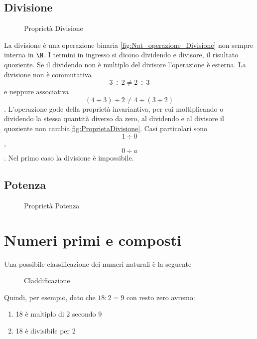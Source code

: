 \subsection{Divisione}
\label{sec:Numerinatdiv}
\begin{figure} %
	\centering

	\caption{Proprietà Divisione}\label{sec:NumerinatDiff}
	\label{fig:ProprietaDivisione}\end{figure}
La divisione è una operazione binaria \nobs\vref{fig:Nat_operazione_Divisione} non sempre interna in $\N$. I termini in ingresso si dicono dividendo e divisore, il risultato quoziente. Se il dividendo non è  multiplo  del divisore l'operazione è esterna. La divisione non è commutativa \[3\div2\neq2\div3\] e neppure associativa \[(4\div3)\div2\neq4\div(3\div2)\]. L'operazione gode della proprietà invariantiva, per cui moltiplicando  o dividendo la stessa quantità diverso da zero, al dividendo e al divisore il quoziente non cambia\nobs\vref{fig:ProprietaDivisione}. Casi particolari sono \[1\div0\], \[0\div a\]. Nel primo caso la divisione è impossibile.
\subsection{Potenza}
\label{sec:NumerinatPot}
\begin{figure} %
	\centering

	\caption{Proprietà Potenza}
	\label{fig:ProprietaPotenza}\end{figure}
\section{Numeri primi e composti}
\label{sec:Numeriprimiecomposti}
Una possibile classificazione dei numeri naturali è la seguente
\begin{figure} %
	\centering

	\caption{Claddificazione}
	\label{fig:ProprietaClassificazioneNumNat}\end{figure}
Quindi, per esempio, dato che $18:2=9$ con resto zero avremo:
\begin{enumerate}
	\item 18 è multiplo di 2 secondo 9
	\item 18 è divisibile per 2
\end{enumerate}
